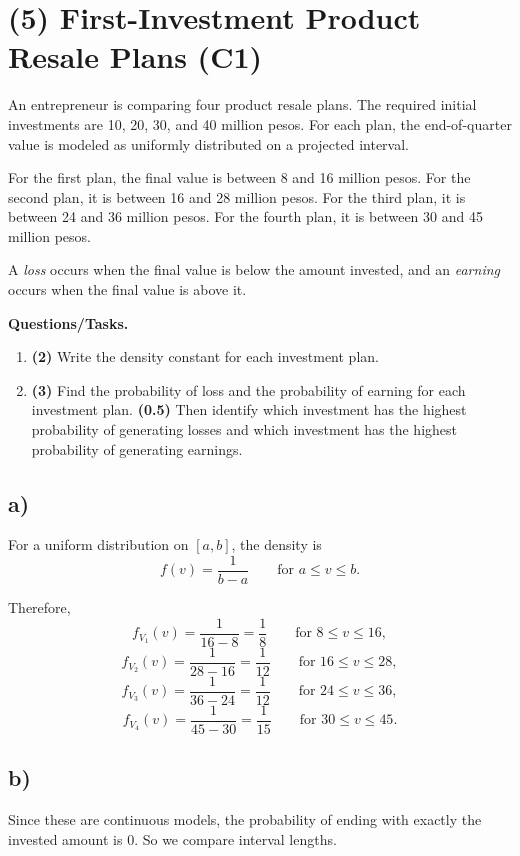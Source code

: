 \section{(5) First-Investment Product Resale Plans (C1)}

An entrepreneur is comparing four product resale plans. The required initial investments are 10, 20, 30, and 40 million pesos. For each plan, the end-of-quarter value is modeled as uniformly distributed on a projected interval.

For the first plan, the final value is between 8 and 16 million pesos. For the second plan, it is between 16 and 28 million pesos. For the third plan, it is between 24 and 36 million pesos. For the fourth plan, it is between 30 and 45 million pesos.

A \emph{loss} occurs when the final value is below the amount invested, and an \emph{earning} occurs when the final value is above it.

\textbf{Questions/Tasks.}
\begin{enumerate}[label=\textbf{\alph*)}]
	\item \textbf{(2)} Write the density constant for each investment plan.
	\item \textbf{(3)} Find the probability of loss and the probability of earning for each investment plan. \textbf{(0.5)} Then identify which investment has the highest probability of generating losses and which investment has the highest probability of generating earnings.
\end{enumerate}

\subsection*{a)}
For a uniform distribution on $[a,b]$, the density is
\[
f(v)=\frac{1}{b-a}\qquad \text{for }a\le v\le b.
\]

Therefore,
\[
f_{V_1}(v)=\frac{1}{16-8}=\frac18
\qquad \text{for }8\le v\le 16,
\]
\[
f_{V_2}(v)=\frac{1}{28-16}=\frac{1}{12}
\qquad \text{for }16\le v\le 28,
\]
\[
f_{V_3}(v)=\frac{1}{36-24}=\frac{1}{12}
\qquad \text{for }24\le v\le 36,
\]
\[
f_{V_4}(v)=\frac{1}{45-30}=\frac{1}{15}
\qquad \text{for }30\le v\le 45.
\]

\subsection*{b)}
Since these are continuous models, the probability of ending with exactly the invested amount is $0$. So we compare interval lengths.

